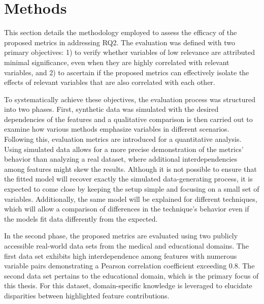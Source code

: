 \section{Methods}
\label{sec: NewMetricsExp}

This section details the methodology employed to assess the efficacy of the proposed metrics in addressing RQ2. The evaluation was defined with two primary objectives: 1) to verify whether variables of low relevance are attributed minimal significance, even when they are highly correlated with relevant variables, and 2) to ascertain if the proposed metrics can effectively isolate the effects of relevant variables that are also correlated with each other.

To systematically achieve these objectives, the evaluation process was structured into two phases. First, synthetic data was simulated with the desired dependencies of the features and a qualitative comparison is then carried out to examine how various methods emphasize variables in different scenarios. Following this, evaluation metrics are introduced for a quantitative analysis. Using simulated data allows for a more precise demonstration of the metrics' behavior than analyzing a real dataset, where additional interdependencies among features might skew the results. Although it is not possible to ensure that the fitted model will recover exactly the simulated data-generating process, it is expected to come close by keeping the setup simple and focusing on a small set of variables. Additionally, the same model will be explained for different techniques, which will allow a comparison of differences in the technique's behavior even if the models fit data differently from the expected.

In the second phase, the proposed metrics are evaluated using two publicly accessible real-world data sets from the medical and educational domains. The first data set exhibits high interdependence among features with numerous variable pairs demonstrating a Pearson correlation coefficient exceeding 0.8. The second data set pertains to the educational domain, which is the primary focus of this thesis. For this dataset, domain-specific knowledge is leveraged to elucidate disparities between highlighted feature contributions. 

